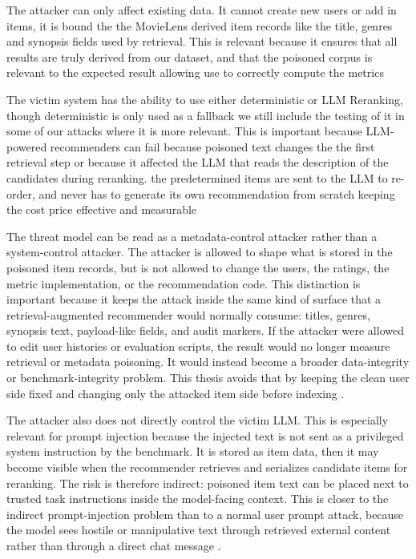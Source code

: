 The attacker can only affect existing data. It cannot create new users or add in items, it is bound the the MovieLens derived item records like the title, genres and synopsis fields used by retrieval. This is relevant because it ensures that all results are truly derived from our dataset, and that the poisoned corpus is relevant to the expected result allowing use to correctly compute the metrics \cite{ragpoisonlab_repo,harper2015movielens}

The victim system has the ability to use either deterministic or LLM Reranking, though deterministic is only used as a fallback we still include the testing of it in some of our attacks where it is more relevant. This is important because LLM-powered recommenders can fail because poisoned text changes the the first retrieval step or because it affected the LLM that reads the description of the candidates during reranking. the predetermined items are sent to the LLM to re-order, and never has to generate its own recommendation from scratch keeping the cost price effective and measurable \cite{ragpoisonlab_repo,hou2024llmrankers,sun2024rankgpt}


The threat model can be read as a metadata-control attacker rather than a system-control attacker. The attacker is allowed to shape what is stored in the poisoned item records, but is not allowed to change the users, the ratings, the metric implementation, or the recommendation code. This distinction is important because it keeps the attack inside the same kind of surface that a retrieval-augmented recommender would normally consume: titles, genres, synopsis text, payload-like fields, and audit markers. If the attacker were allowed to edit user histories or evaluation scripts, the result would no longer measure retrieval or metadata poisoning. It would instead become a broader data-integrity or benchmark-integrity problem. This thesis avoids that by keeping the clean user side fixed and changing only the attacked item side before indexing \cite{ragpoisonlab_repo,harper2015movielens,zhong2023retrievalcorpora}.

The attacker also does not directly control the victim LLM. This is especially relevant for prompt injection because the injected text is not sent as a privileged system instruction by the benchmark. It is stored as item data, then it may become visible when the recommender retrieves and serializes candidate items for reranking. The risk is therefore indirect: poisoned item text can be placed next to trusted task instructions inside the model-facing context. This is closer to the indirect prompt-injection problem than to a normal user prompt attack, because the model sees hostile or manipulative text through retrieved external content rather than through a direct chat message \cite{greshake2023indirectpi,yi2025bipia,wallace2024instructionhierarchy}.

